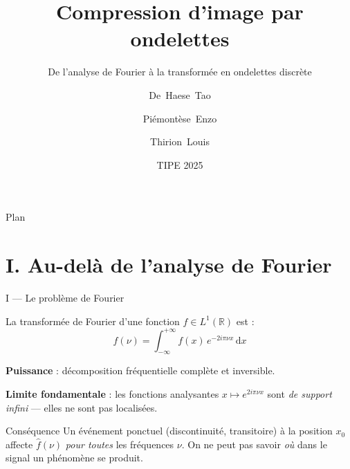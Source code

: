 \documentclass[10pt]{beamer}
\title{Compression d'image par ondelettes}
\subtitle{De l'analyse de Fourier à la transformée en ondelettes discrète}
\author{De~Haese~Tao \and Piémontèse~Enzo \and Thirion~Louis}
\institute{Cité scolaire Carnot}
\date{TIPE 2025}
\newcommand{\RR}{\mathbb{R}}
\renewcommand{\d}{\,\mathrm{d}}
\begin{document}
	
	\begin{frame}
		\titlepage
	\end{frame}
	
	\begin{frame}{Plan}
		\tableofcontents
	\end{frame}
	
	\section{I. Au-delà de l'analyse de Fourier}
	
	\begin{frame}{I — Le problème de Fourier}
		
		La transformée de Fourier d'une fonction $f \in L^1(\RR)$ est :
		\[
		\hat{f}(\nu) = \int_{-\infty}^{+\infty} f(x)\, e^{-2i\pi\nu x} \d x
		\]
		
		\medskip
		\textbf{Puissance} : décomposition fréquentielle complète et inversible.
		
		\medskip
		\textbf{Limite fondamentale} : les fonctions analysantes $x \mapsto e^{2i\pi\nu x}$
		sont \emph{de support infini} — elles ne sont pas localisées.
		
		\medskip
		\begin{block}{Conséquence}
			Un événement ponctuel (discontinuité, transitoire) à la position $x_0$
			affecte $\hat{f}(\nu)$ \emph{pour toutes} les fréquences $\nu$.
			On ne peut pas savoir \emph{où} dans le signal un phénomène se produit.
		\end{block}
		
	\end{frame}
	
\end{document}
